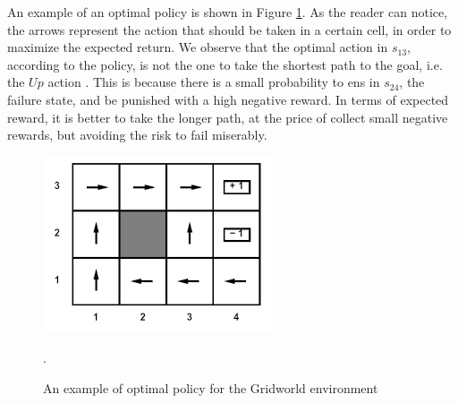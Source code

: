 \begin{example}
An example of an optimal policy is shown in Figure \ref{gridworld-optimal-policy}. As the reader can notice, the arrows represent the action that should be taken in a certain cell, in order to maximize the expected return. We observe that the optimal action in $s_{13}$, according to the policy, is not the one to take the shortest path to the goal, i.e. the $Up$ action	. This is because there is a small probability to ens in $s_{24}$, the failure state, and be punished with a high negative reward. In terms of expected reward, it is better to take the longer path, at the price of collect small negative rewards, but avoiding the risk to fail miserably.
\begin{figure}
	\centering
	\includegraphics[width=.4\linewidth]{images/gridworld-optimal-policy}
	\caption{An example of optimal policy for the Gridworld environment}\label{gridworld-optimal-policy}. 
\end{figure}

\end{example}

